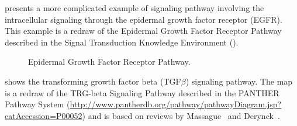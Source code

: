  presents a more complicated example of signaling pathway involving the intracellular signaling through the epidermal growth factor receptor (EGFR).  This example is a redraw of the Epidermal Growth Factor Receptor Pathway described in the Signal Transduction Knowledge Environment (\stkeurl).


\begin{figure}
\begin{center}
\caption{Epidermal Growth Factor Receptor Pathway.}\label{fig:EGF}
\end{center}
\end{figure}

 shows the transforming growth factor beta (TGF$\beta$) signaling pathway.  The map is a redraw of the TRG-beta Signaling Pathway described in the PANTHER Pathway System (\url{http://www.pantherdb.org/pathway/pathwayDiagram.jsp?catAccession=P00052}) and is based on reviews by Massague~\cite{Massague:1998} and Derynck~\cite{Derynck:2001}.

